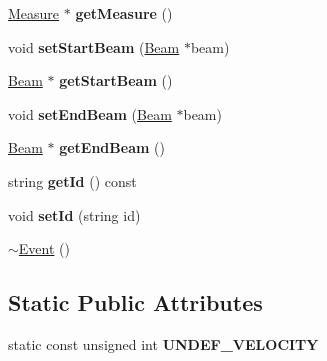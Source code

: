 \begin{DoxyCompactItemize}
\item 
\mbox{\label{classScoreModel_1_1Event_a60f960de4ae5bfafd43778bbc9873ce8}} 
\mbox{\hyperlink{classScoreModel_1_1Measure}{Measure}} $\ast$ {\bfseries get\+Measure} ()
\item 
\mbox{\label{classScoreModel_1_1Event_a0fcaff7d9c5fdcf35fed5b67cdaca4b9}} 
void {\bfseries set\+Start\+Beam} (\mbox{\hyperlink{classScoreModel_1_1Beam}{Beam}} $\ast$beam)
\item 
\mbox{\label{classScoreModel_1_1Event_a14c20827cc116c68376cd20f66c974f4}} 
\mbox{\hyperlink{classScoreModel_1_1Beam}{Beam}} $\ast$ {\bfseries get\+Start\+Beam} ()
\item 
\mbox{\label{classScoreModel_1_1Event_ac90f374d347bbb44e08590b62c0ef3b0}} 
void {\bfseries set\+End\+Beam} (\mbox{\hyperlink{classScoreModel_1_1Beam}{Beam}} $\ast$beam)
\item 
\mbox{\label{classScoreModel_1_1Event_a1d0e5a432ad6f00807b00f5d5a17f412}} 
\mbox{\hyperlink{classScoreModel_1_1Beam}{Beam}} $\ast$ {\bfseries get\+End\+Beam} ()
\item 
\mbox{\label{classScoreModel_1_1Event_aba12bfff200e2712a8a81e1897fc39cc}} 
string {\bfseries get\+Id} () const
\item 
\mbox{\label{classScoreModel_1_1Event_a27efb946e1900cebd3ed72e073f98024}} 
void {\bfseries set\+Id} (string id)
\item 
\mbox{\hyperlink{classScoreModel_1_1Event_a028708f328e5508208809b788b3498e2}{$\sim$\+Event}} ()
\end{DoxyCompactItemize}
\subsection*{Static Public Attributes}
\begin{DoxyCompactItemize}
\item 
\mbox{\label{classScoreModel_1_1Event_a35564de0740e9c4218f36b9deb5aeeec}} 
static const unsigned int {\bfseries U\+N\+D\+E\+F\+\_\+\+V\+E\+L\+O\+C\+I\+TY}
\end{DoxyCompactItemize}


